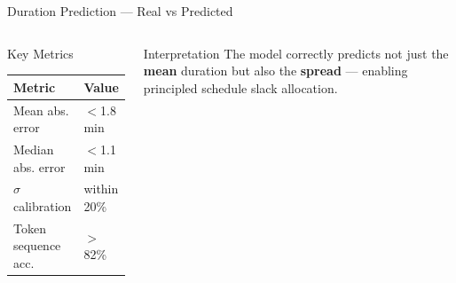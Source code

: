 \documentclass[aspectratio=169,12pt]{beamer}
\begin{document}
\begin{frame}[shrink=10]{Duration Prediction — Real vs Predicted}
\begin{columns}[T]
\vspace{8pt}
\begin{block}{Key Metrics}
  \begin{tabular}{ll}
    \toprule
    Metric & Value \\
    \midrule
    Mean abs. error & $<$1.8 min \\
    Median abs. error & $<$1.1 min \\
    $\sigma$ calibration & within 20\% \\
    Token sequence acc. & $>$82\% \\
    \bottomrule
  \end{tabular}
\end{block}
\vspace{6pt}
\begin{exampleblock}{Interpretation}
  The model correctly predicts not just the \textbf{mean} duration but also the \textbf{spread} — enabling principled schedule slack allocation.
\end{exampleblock}
\end{columns}
\end{frame}
\end{document}
